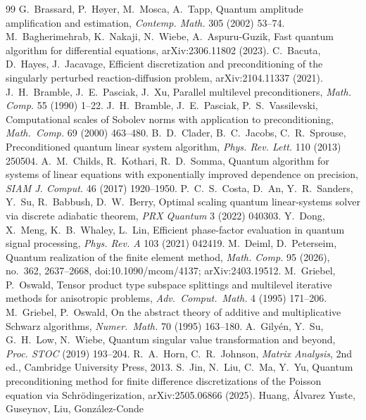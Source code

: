 \documentclass[11pt,a4paper]{article}
\theoremstyle{remark}
\begin{document}
\begin{thebibliography}{99}
 G.~Brassard, P.~H{\o}yer, M.~Mosca, A.~Tapp, Quantum amplitude
  amplification and estimation, \emph{Contemp. Math.} 305 (2002) 53--74.
 M.~Bagherimehrab, K.~Nakaji, N.~Wiebe, A.~Aspuru-Guzik, Fast
  quantum algorithm for differential equations, arXiv:2306.11802 (2023).
 C.~Bacuta, D.~Hayes, J.~Jacavage, Efficient discretization and
  preconditioning of the singularly perturbed reaction-diffusion problem,
  arXiv:2104.11337 (2021).
 J.~H.~Bramble, J.~E.~Pasciak, J.~Xu, Parallel multilevel
  preconditioners, \emph{Math. Comp.} 55 (1990) 1--22.
 J.~H.~Bramble, J.~E.~Pasciak, P.~S.~Vassilevski, Computational
  scales of Sobolev norms with application to preconditioning, \emph{Math.\
  Comp.} 69 (2000) 463--480.
 B.~D.~Clader, B.~C.~Jacobs, C.~R.~Sprouse, Preconditioned quantum
  linear system algorithm, \emph{Phys. Rev. Lett.} 110 (2013) 250504.
\bibitem{CKS17} A.~M.~Childs, R.~Kothari, R.~D.~Somma, Quantum algorithm for
  systems of linear equations with exponentially improved dependence on
  precision, \emph{SIAM J. Comput.} 46 (2017) 1920--1950.
 P.~C.~S.~Costa, D.~An, Y.~R.~Sanders, Y.~Su, R.~Babbush,
  D.~W.~Berry, Optimal scaling quantum linear-systems solver via discrete
  adiabatic theorem, \emph{PRX Quantum} 3 (2022) 040303.
 Y.~Dong, X.~Meng, K.~B.~Whaley, L.~Lin, Efficient phase-factor
  evaluation in quantum signal processing, \emph{Phys. Rev. A} 103 (2021)
  042419.
 M.~Deiml, D.~Peterseim, Quantum realization of the finite element
  method, \emph{Math. Comp.} 95 (2026), no.~362, 2637--2668,
  doi:10.1090/mcom/4137; arXiv:2403.19512.
 M.~Griebel, P.~Oswald, Tensor product type subspace splittings
  and multilevel iterative methods for anisotropic problems, \emph{Adv.\
  Comput.\ Math.} 4 (1995) 171--206.
\bibitem{GO95b} M.~Griebel, P.~Oswald, On the abstract theory of additive and
  multiplicative Schwarz algorithms, \emph{Numer.\ Math.} 70 (1995) 163--180.
\bibitem{GSLW19} A.~Gily\'en, Y.~Su, G.~H.~Low, N.~Wiebe, Quantum singular value
  transformation and beyond, \emph{Proc. STOC} (2019) 193--204.
\bibitem{HJ13} R.~A.~Horn, C.~R.~Johnson, \emph{Matrix Analysis}, 2nd ed.,
  Cambridge University Press, 2013.
\bibitem{JLMY25} S.~Jin, N.~Liu, C.~Ma, Y.~Yu, Quantum preconditioning method for
  finite difference discretizations of the Poisson equation via
  Schr\"odingerization, arXiv:2505.06866 (2025).
\bibitem{Huang26} Huang, \'Alvarez Yuste, Guseynov, Liu, Gonz\'alez-Conde

\end{thebibliography}
\end{document}
